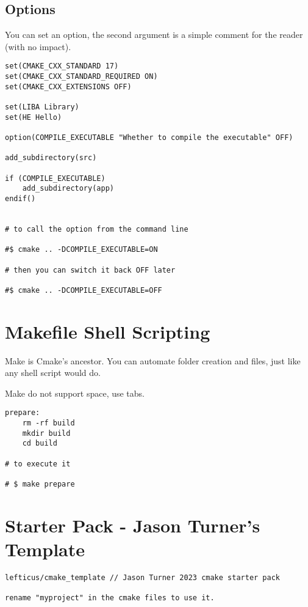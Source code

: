 \documentclass[openany]{report}
\begin{document}
\subsection{Options}

You can set an option, the second argument is a simple comment for the reader (with no impact).

\begin{verbatim}
set(CMAKE_CXX_STANDARD 17)
set(CMAKE_CXX_STANDARD_REQUIRED ON)
set(CMAKE_CXX_EXTENSIONS OFF)

set(LIBA Library)
set(HE Hello)

option(COMPILE_EXECUTABLE "Whether to compile the executable" OFF)

add_subdirectory(src)

if (COMPILE_EXECUTABLE)
    add_subdirectory(app)
endif()


# to call the option from the command line

#$ cmake .. -DCOMPILE_EXECUTABLE=ON

# then you can switch it back OFF later

#$ cmake .. -DCOMPILE_EXECUTABLE=OFF
\end{verbatim}


\section{Makefile Shell Scripting}

Make is Cmake's ancestor. You can automate folder creation and files, just like any shell script would do. 

Make do not support space, use tabs.

\begin{verbatim}
prepare:
    rm -rf build
    mkdir build
    cd build

# to execute it

# $ make prepare
\end{verbatim}


\section{Starter Pack - Jason Turner's Template}

\begin{verbatim}
lefticus/cmake_template // Jason Turner 2023 cmake starter pack

rename "myproject" in the cmake files to use it.
\end{verbatim}
\end{document}
